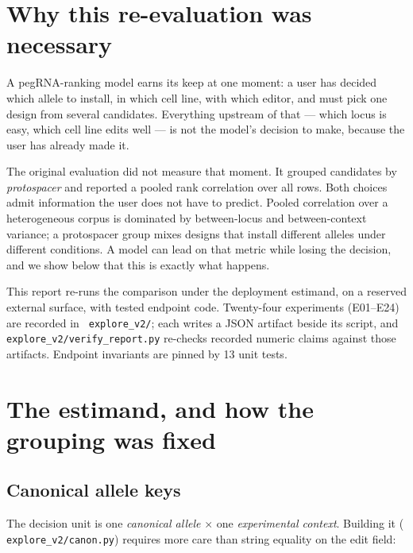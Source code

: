 \documentclass[11pt]{article}
\newcommand{\code}[1]{\texttt{\small\begingroup\hyphenpenalty=10000 #1\endgroup}}
\begin{document}
\tableofcontents
\bigskip

\section{Why this re-evaluation was necessary}

A pegRNA-ranking model earns its keep at one moment: a user has decided which allele to
install, in which cell line, with which editor, and must pick one design from several
candidates. Everything upstream of that --- which locus is easy, which cell line edits well
--- is not the model's decision to make, because the user has already made it.

The original evaluation did not measure that moment. It grouped candidates by
\emph{protospacer} and reported a pooled rank correlation over all rows. Both choices admit
information the user does not have to predict. Pooled correlation over a heterogeneous corpus
is dominated by between-locus and between-context variance; a protospacer group mixes designs
that install different alleles under different conditions. A model can lead on that metric
while losing the decision, and we show below that this is exactly what happens.

This report re-runs the comparison under the deployment estimand, on a reserved external
surface, with tested endpoint code. Twenty-four experiments (E01--E24) are recorded in
\code{explore\_v2/}; each writes a JSON artifact beside its script, and
\code{explore\_v2/verify\_report.py} re-checks recorded numeric claims against those artifacts.
Endpoint invariants are pinned by 13 unit tests.

\section{The estimand, and how the grouping was fixed}

\subsection{Canonical allele keys}

The decision unit is one \emph{canonical allele} $\times$ one \emph{experimental context}.
Building it (\code{explore\_v2/canon.py}) requires more care than string equality on the edit
field:
\end{document}
